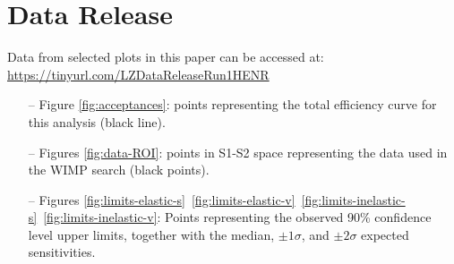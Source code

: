 \documentclass[reprint, showpacs,
preprintnumbers,
amsmath,amssymb,
aps, floatfix,
superscriptaddress,
prd, nofootinbib]{revtex4-1}
\begin{document}
\newpage
\section{Data Release\label{ap:2}}
Data from selected plots in this paper can be accessed at: \href{https://tinyurl.com/LZDataReleaseRun1HENR}{https://tinyurl.com/LZDataReleaseRun1HENR}

\begin{itemize}
    \item[--] Figure \ref{fig:acceptances}:
   points representing the total efficiency curve for this analysis (black line).
    \item[--] Figures \ref{fig:data-ROI}: points in S1-S2 space representing the data used in the WIMP search (black points).
    \item[--] Figures \ref{fig:limits-elastic-s}~\ref{fig:limits-elastic-v}~\ref{fig:limits-inelastic-s}~\ref{fig:limits-inelastic-v}: Points representing the observed 90\% confidence level upper limits, together with the median, $\pm1\sigma$, and $\pm2\sigma$ expected sensitivities.
\end{itemize}


\end{document}
